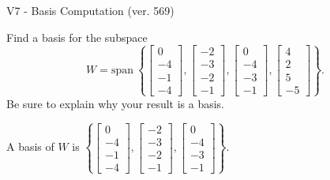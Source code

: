 \begin{exercise}
  \begin{exerciseTitle}V7 - Basis Computation (ver. 569)\end{exerciseTitle}
  \begin{exerciseStatement}
    Find a basis for the subspace 
\[W=\mathrm{span}\ \left\{\left[\begin{array}{r}
0 \\
-4 \\
-1 \\
-4
\end{array}\right] , \left[\begin{array}{r}
-2 \\
-3 \\
-2 \\
-1
\end{array}\right] , \left[\begin{array}{r}
0 \\
-4 \\
-3 \\
-1
\end{array}\right] , \left[\begin{array}{r}
4 \\
2 \\
5 \\
-5
\end{array}\right]\right\}.\]
 Be sure to explain why your result is a basis.


  \end{exerciseStatement}
  \begin{exerciseAnswer}
   A basis of \(W\) is  \(\left\{\left[\begin{array}{r}
0 \\
-4 \\
-1 \\
-4
\end{array}\right] , \left[\begin{array}{r}
-2 \\
-3 \\
-2 \\
-1
\end{array}\right] , \left[\begin{array}{r}
0 \\
-4 \\
-3 \\
-1
\end{array}\right]\right\}\).
  


  \end{exerciseAnswer}
\end{exercise}